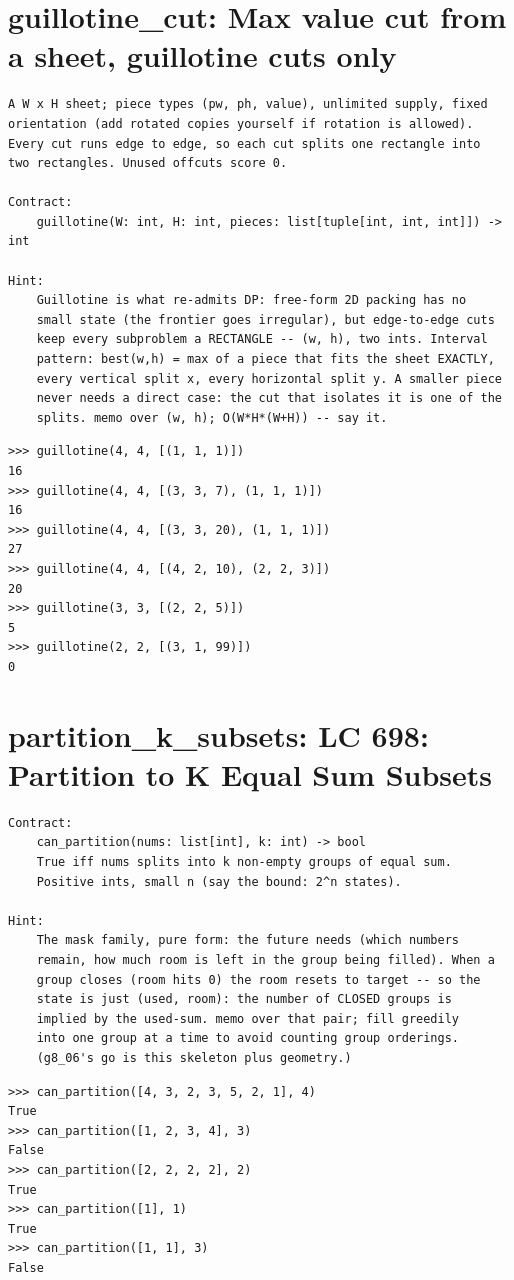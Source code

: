 \documentclass[10pt,letterpaper]{book}
\begin{document}
\section{guillotine\_cut: Max value cut from a sheet, guillotine cuts only}
\begin{lstlisting}[style=ex]
A W x H sheet; piece types (pw, ph, value), unlimited supply, fixed
orientation (add rotated copies yourself if rotation is allowed).
Every cut runs edge to edge, so each cut splits one rectangle into
two rectangles. Unused offcuts score 0.

Contract:
    guillotine(W: int, H: int, pieces: list[tuple[int, int, int]]) -> int

Hint:
    Guillotine is what re-admits DP: free-form 2D packing has no
    small state (the frontier goes irregular), but edge-to-edge cuts
    keep every subproblem a RECTANGLE -- (w, h), two ints. Interval
    pattern: best(w,h) = max of a piece that fits the sheet EXACTLY,
    every vertical split x, every horizontal split y. A smaller piece
    never needs a direct case: the cut that isolates it is one of the
    splits. memo over (w, h); O(W*H*(W+H)) -- say it.
\end{lstlisting}
\begin{lstlisting}[style=ex]
>>> guillotine(4, 4, [(1, 1, 1)])
16
>>> guillotine(4, 4, [(3, 3, 7), (1, 1, 1)])
16
>>> guillotine(4, 4, [(3, 3, 20), (1, 1, 1)])
27
>>> guillotine(4, 4, [(4, 2, 10), (2, 2, 3)])
20
>>> guillotine(3, 3, [(2, 2, 5)])
5
>>> guillotine(2, 2, [(3, 1, 99)])
0
\end{lstlisting}

\section{partition\_k\_subsets: LC 698: Partition to K Equal Sum Subsets}
\begin{lstlisting}[style=ex]
Contract:
    can_partition(nums: list[int], k: int) -> bool
    True iff nums splits into k non-empty groups of equal sum.
    Positive ints, small n (say the bound: 2^n states).

Hint:
    The mask family, pure form: the future needs (which numbers
    remain, how much room is left in the group being filled). When a
    group closes (room hits 0) the room resets to target -- so the
    state is just (used, room): the number of CLOSED groups is
    implied by the used-sum. memo over that pair; fill greedily
    into one group at a time to avoid counting group orderings.
    (g8_06's go is this skeleton plus geometry.)
\end{lstlisting}
\begin{lstlisting}[style=ex]
>>> can_partition([4, 3, 2, 3, 5, 2, 1], 4)
True
>>> can_partition([1, 2, 3, 4], 3)
False
>>> can_partition([2, 2, 2, 2], 2)
True
>>> can_partition([1], 1)
True
>>> can_partition([1, 1], 3)
False
\end{lstlisting}
\end{document}
